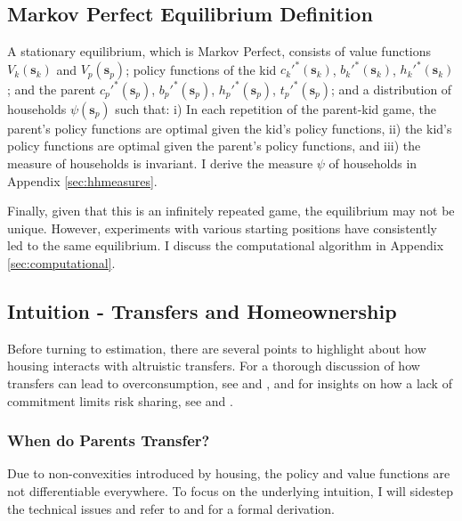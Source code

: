\documentclass[12pt]{article}
\begin{document}
\subsection{Markov Perfect Equilibrium Definition}
A stationary equilibrium, which is Markov Perfect, consists of value functions $V_k(\mathbf{s}_k)$ and $V_p(\mathbf{s}_p)$;  policy functions of the kid $c_k'^*(\mathbf{s}_k)$, $b_k'^*(\mathbf{s}_k)$, $h_k'^*(\mathbf{s}_k)$; and the parent $c_p'^*(\mathbf{s}_p)$, $b_p'^*(\mathbf{s}_p)$, $h_p'^*(\mathbf{s}_p)$, $t_p'^*(\mathbf{s}_p)$; and a distribution of households $\psi(\mathbf{s}_p)$ such that: i) In each repetition of the parent-kid game, the parent's policy functions are optimal given the kid's policy functions, ii) the kid's policy functions are optimal given the parent's policy functions, and iii) the measure of households is invariant. I derive the measure $\psi$ of households in Appendix \ref{sec:hhmeasures}.

Finally, given that this is an infinitely repeated game, the equilibrium may not be unique. However, experiments with various starting positions have consistently led to the same equilibrium. I discuss the computational algorithm in Appendix \ref{sec:computational}.


\subsection{Intuition - Transfers and Homeownership}\label{sec:modelintuition}
Before turning to estimation, there are several points to highlight about how housing interacts with altruistic transfers. For a thorough discussion of how transfers can lead to overconsumption, see \cite{Altonji1997a} and \cite{Barczyk2014}, and for insights on how a lack of commitment limits risk sharing, see \cite{Attanasio2018} and \cite{Mommaerts2016}. 

\subsubsection{When do Parents Transfer?}
Due to non-convexities introduced by housing, the policy and value functions are not differentiable everywhere. To focus on the underlying intuition, I will sidestep the technical issues and refer to \cite{Barczyk2020} and \cite{Chu2020} for a formal derivation.
\end{document}

